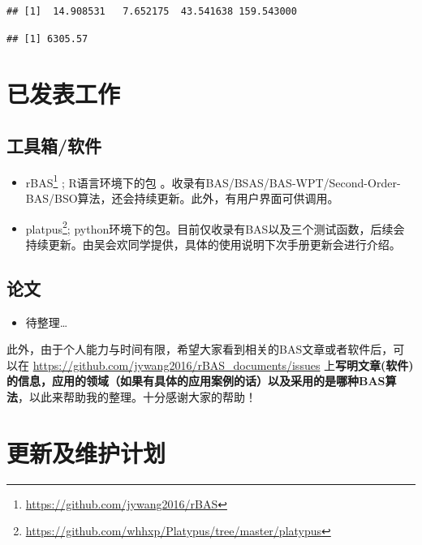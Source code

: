 \documentclass[]{ctexbook}
\newenvironment{Shaded}{\begin{snugshade}}{\end{snugshade}}
\newcommand{\OperatorTok}[1]{\textcolor[rgb]{0.81,0.36,0.00}{\textbf{#1}}}
\newcommand{\NormalTok}[1]{#1}
\providecommand{\tightlist}{%
  \setlength{\itemsep}{0pt}\setlength{\parskip}{0pt}}
\renewcommand{\href}[2]{#2\footnote{\url{#1}}}
\theoremstyle{definition}
\theoremstyle{definition}
\theoremstyle{definition}
\theoremstyle{remark}
\begin{document}
\begin{verbatim}
## [1]  14.908531   7.652175  43.541638 159.543000
\end{verbatim}

\begin{Shaded}
\end{Shaded}

\begin{verbatim}
## [1] 6305.57
\end{verbatim}

\chapter{已发表工作}\label{paper}

\section{工具箱/软件}

\begin{itemize}
\item
  \href{https://github.com/jywang2016/rBAS}{rBAS} ; R语言环境下的包
  。收录有BAS/BSAS/BAS-WPT/Second-Order-BAS/BSO算法，还会持续更新。此外，有用户界面可供调用。
\item
  \href{https://github.com/whhxp/Platypus/tree/master/platypus}{platpus};
  python环境下的包。目前仅收录有BAS以及三个测试函数，后续会持续更新。由吴会欢同学提供，具体的使用说明下次手册更新会进行介绍。
\end{itemize}

\section{论文}

\begin{itemize}
\tightlist
\item
  待整理\ldots{}
\end{itemize}

此外，由于个人能力与时间有限，希望大家看到相关的BAS文章或者软件后，可以在
\url{https://github.com/jywang2016/rBAS_documents/issues}
上\textbf{写明文章(软件)的信息，应用的领域（如果有具体的应用案例的话）以及采用的是哪种BAS算法}，以此来帮助我的整理。十分感谢大家的帮助！

\chapter{更新及维护计划}\label{updates}
\end{document}
